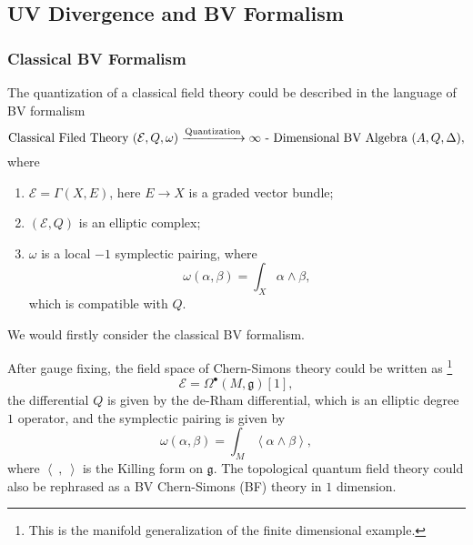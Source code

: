 \documentclass[10pt]{article}
\begin{document}
\subsection{UV Divergence and BV Formalism}

\subsubsection{Classical BV Formalism}

The quantization of a classical field theory could be described in the language of BV formalism
\begin{equation*}
  \text{Classical Filed Theory $(\mathcal{E}, Q, \omega)$} \xrightarrow{\text{Quantization}} \text{$ \infty $ - Dimensional BV Algebra $(A, Q, \Delta)$},
\end{equation*}
where
\begin{enumerate}[(1)]
  \item $ \mathcal{E} = \Gamma(X, E)$, here $ E \rightarrow X$ is a graded vector bundle;
  \item $\left( \mathcal{E}, Q \right)$ is an elliptic complex;
  \item $ \omega$ is a local $-1$ symplectic pairing, where
    \begin{equation*}
      \omega(\alpha, \beta) = \int _{X} \alpha \wedge \beta,
    \end{equation*}
    which is compatible with $ Q$.
\end{enumerate}
We would firstly consider the classical BV formalism.

\begin{example}
  After gauge fixing, the field space of Chern-Simons theory could be written as \footnote{This is the manifold generalization of the finite dimensional example.}
  \begin{equation*}
    \mathcal{E} = \Omega^{\bullet}(M, \mathfrak{g})[1],
  \end{equation*}
  the differential $ Q$ is given by the de-Rham differential, which is an elliptic degree $ 1$ operator, and the symplectic pairing is given by
  \begin{equation*}
    \omega(\alpha, \beta) = \int _{M} \left< \alpha \wedge \beta \right>,
  \end{equation*}
  where $\left< ~,~ \right>$ is the Killing form on $ \mathfrak{g}$.
  The topological quantum field theory could also be rephrased as a BV Chern-Simons (BF) theory in $ 1$ dimension.
\end{example}
\end{document}
